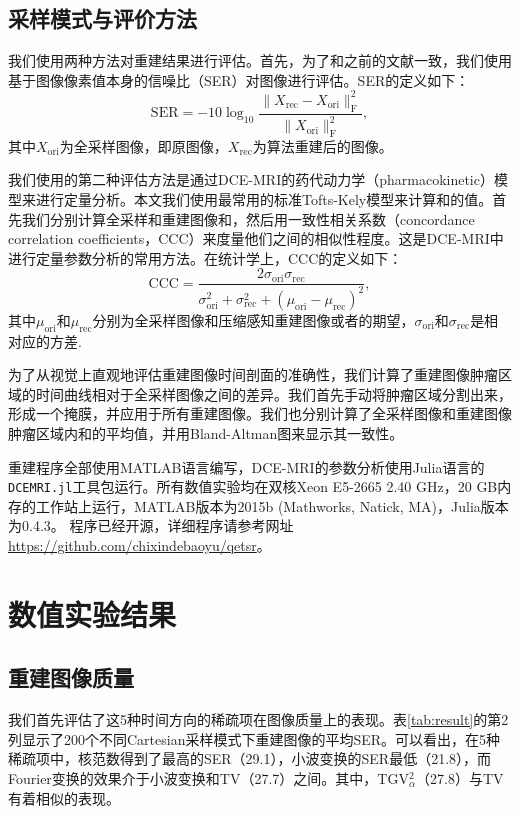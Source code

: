 \subsection{采样模式与评价方法}
我们使用两种方法对重建结果进行评估。首先，为了和之前的文献一致，我们使用基于图像像素值本身的信噪比（SER）对图像进行评估。SER的定义如下：
\begin{equation}
\mathrm{SER} = -10 \log_{10}\frac{\|X_\mathrm{rec}-X_\mathrm{ori}\|_\mathrm{F}^2}{\|X_\mathrm{ori}\|_\mathrm{F}^2},
\end{equation}
其中$X_{\mathrm{ori}}$为全采样图像，即原图像，$X_{\mathrm{rec}}$为算法重建后的图像。

我们使用的第二种评估方法是通过DCE-MRI的药代动力学（pharmacokinetic）模型来进行定量分析。本文我们使用最常用的标准Tofts-Kely模型\cite{tofts}来计算\kt 和\Ve 的值。首先我们分别计算全采样和重建图像\kt 和\Ve，然后用一致性相关系数（concordance correlation coefficients，CCC）来度量他们之间的相似性程度。这是DCE-MRI中进行定量参数分析的常用方法。在统计学上，CCC的定义如下：
\begin{equation}
\mathrm{CCC} = \frac{2\sigma_\mathrm{ori} \sigma_\mathrm{rec}}{\sigma_\mathrm{ori}^2+\sigma_\mathrm{rec}^2+(\mu_\mathrm{ori}-\mu_\mathrm{rec})^2},
\end{equation}
其中$\mu_\mathrm{ori}$和$\mu_\mathrm{rec}$分别为全采样图像和压缩感知重建图像\kt 或者\Ve 的期望，$\sigma_\mathrm{ori}$和$\sigma_\mathrm{rec}$是相对应的方差.

为了从视觉上直观地评估重建图像时间剖面的准确性，我们计算了重建图像肿瘤区域的时间曲线相对于全采样图像之间的差异。我们首先手动将肿瘤区域分割出来，形成一个掩膜，并应用于所有重建图像。我们也分别计算了全采样图像和重建图像肿瘤区域内\kt 和\Ve 的平均值，并用Bland-Altman图来显示其一致性。

重建程序全部使用MATLAB语言编写，DCE-MRI的参数分析使用Julia语言的\texttt{DCEMRI.jl}\cite{Smith2015}工具包运行。所有数值实验均在双核Xeon E5-2665 2.40 GHz，20 GB内存的工作站上运行，MATLAB版本为2015b (Mathworks, Natick, MA)，Julia版本为0.4.3。
程序已经开源，详细程序请参考网址\url{https://github.com/chixindebaoyu/qetsr}。

\section{数值实验结果}
\subsection{重建图像质量}
我们首先评估了这5种时间方向的稀疏项在图像质量上的表现。表\ref{tab:result}的第2列显示了200个不同Cartesian采样模式下重建图像的平均SER。可以看出，在5种稀疏项中，核范数得到了最高的SER（29.1），小波变换的SER最低（21.8），而Fourier变换的效果介于小波变换和TV（27.7）之间。其中，TGV$_\alpha^2$（27.8）与TV有着相似的表现。

